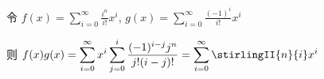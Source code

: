 令 \(\displaystyle f(x)=\sum_{i=0}^{\infty}\frac{i^n}{i!}x^i\), \(\displaystyle g(x)=\sum_{i=0}^{\infty}\frac{(-1)^i}{i!}x^i\)

则 \(\displaystyle f(x)g(x)=\sum_{i=0}^{\infty}x^i\sum_{j=0}^i\frac{(-1)^{i-j}j^n}{j!(i-j)!}=\sum_{i=0}^{\infty}\stirlingII{n}{i}x^i\)

